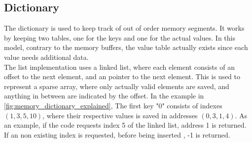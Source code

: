 \subsection{Dictionary} \label{subsec:dictionary}
The dictionary is used to keep track of out of order memory segments.
It works by keeping two tables, one for the keys and one for the actual values.
In this model, contrary to the memory buffers, the value table actually exists
since each value needs additional data. \\
The list implementation uses a linked list, where each element consists of an
offset to the next element, and an pointer to the next element. This is used to
represent a sparse array, where only actually valid elements are saved, and
anything in between are indicated by the offset.
 In the example in
\autoref{fig:memory_dictionary_explained}, The first key "0" consists of indexes
$(1,3,5,10)$, where their respective values is saved in
addresses $(0,3,1,4)$. As an example,
if the code requests index 5 of the linked list, address 1 is returned. If an
non existing index is requested, before being inserted , -1 is returned.
